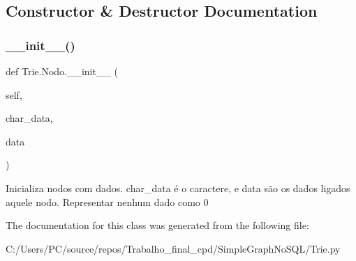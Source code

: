 \subsection{Constructor \& Destructor Documentation}
\mbox{\label{class_trie_1_1_nodo_a14edf9313e0cb711a55c47d8250b566b}} 
\subsubsection{\texorpdfstring{\+\_\+\+\_\+init\+\_\+\+\_\+()}{\_\_init\_\_()}}
{\footnotesize\ttfamily def Trie.\+Nodo.\+\_\+\+\_\+init\+\_\+\+\_\+ (\begin{DoxyParamCaption}\item[{}]{self,  }\item[{}]{char\+\_\+data,  }\item[{}]{data }\end{DoxyParamCaption})}

\begin{DoxyVerb}Inicializa nodos com dados. char_data é o caractere, e data são os dados ligados aquele nodo. Representar nenhum dado como 0 \end{DoxyVerb}
 

The documentation for this class was generated from the following file\+:\begin{DoxyCompactItemize}
\item 
C\+:/\+Users/\+P\+C/source/repos/\+Trabalho\+\_\+final\+\_\+cpd/\+Simple\+Graph\+No\+S\+Q\+L/Trie.\+py\end{DoxyCompactItemize}
